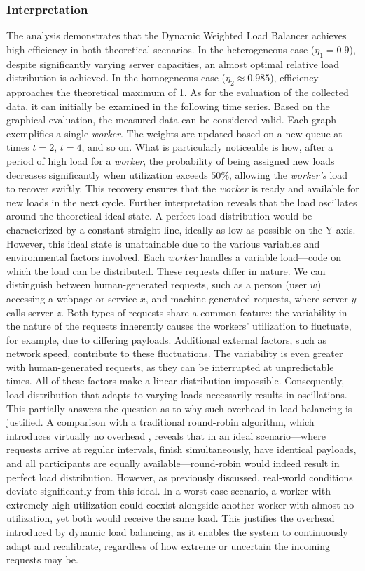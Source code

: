 \documentclass[twocolumn]{webofc}
\begin{document}
\subsubsection{Interpretation}
The analysis demonstrates that the Dynamic Weighted Load Balancer achieves high efficiency in both theoretical scenarios. In the heterogeneous case (\(\eta_1 = 0.9\)), despite significantly varying server capacities, an almost optimal relative load distribution is achieved. In the homogeneous case (\(\eta_2 \approx 0.985\)), efficiency approaches the theoretical maximum of 1. As for the evaluation of the collected data, it can initially be examined in the following time series. Based on the graphical evaluation, the measured data can be considered valid. Each graph exemplifies a single \textit{worker}. The weights are updated based on a new queue at times \(t=2\), \(t=4\), and so on. What is particularly noticeable is how, after a period of high load for a \textit{worker}, the probability of being assigned new loads decreases significantly when utilization exceeds \(50\%\), allowing the \textit{worker's} load to recover swiftly. This recovery ensures that the \textit{worker} is ready and available for new loads in the next cycle. Further interpretation reveals that the load oscillates around the theoretical ideal state. A perfect load distribution would be characterized by a constant straight line, ideally as low as possible on the Y-axis. However, this ideal state is unattainable due to the various variables and environmental factors involved. Each \textit{worker} handles a variable load—code on which the load can be distributed. These requests differ in nature. We can distinguish between human-generated requests, such as a person (user \(w\)) accessing a webpage or service \(x\), and machine-generated requests, where server \(y\) calls server \(z\). Both types of requests share a common feature: the variability in the nature of the requests inherently causes the workers' utilization to fluctuate, for example, due to differing payloads. Additional external factors, such as network speed, contribute to these fluctuations. The variability is even greater with human-generated requests, as they can be interrupted at unpredictable times. All of these factors make a linear distribution impossible. Consequently, load distribution that adapts to varying loads necessarily results in oscillations. This partially answers the question as to why such overhead in load balancing is justified. A comparison with a traditional round-robin algorithm, which introduces virtually no overhead \cite{arpaci-dusseau2014operating}, reveals that in an ideal scenario—where requests arrive at regular intervals, finish simultaneously, have identical payloads, and all participants are equally available—round-robin would indeed result in perfect load distribution. However, as previously discussed, real-world conditions deviate significantly from this ideal. In a worst-case scenario, a worker with extremely high utilization could coexist alongside another worker with almost no utilization, yet both would receive the same load. This justifies the overhead introduced by dynamic load balancing, as it enables the system to continuously adapt and recalibrate, regardless of how extreme or uncertain the incoming requests may be.
\end{document}
